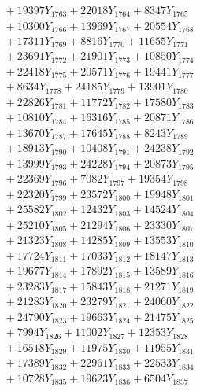 \documentclass[a4paper,10pt]{article}
\begin{document}
{\begin{align}
&\;  + 19397 Y_{1763} + 22018 Y_{1764} + 8347 Y_{1765} \\[0.3ex]
&\;  + 10300 Y_{1766} + 13969 Y_{1767} + 20554 Y_{1768} \\[0.5ex]\allowbreak
&\;  + 17311 Y_{1769} + 8816 Y_{1770} + 11655 Y_{1771} \\[0.3ex]
&\;  + 23691 Y_{1772} + 21901 Y_{1773} + 10850 Y_{1774} \\[0.3ex]
&\;  + 22418 Y_{1775} + 20571 Y_{1776} + 19441 Y_{1777} \\[0.3ex]
&\;  + 8634 Y_{1778} + 24185 Y_{1779} + 13901 Y_{1780} \\[0.3ex]
&\;  + 22826 Y_{1781} + 11772 Y_{1782} + 17580 Y_{1783} \\[0.3ex]
&\;  + 10810 Y_{1784} + 16316 Y_{1785} + 20871 Y_{1786} \\[0.3ex]
&\;  + 13670 Y_{1787} + 17645 Y_{1788} + 8243 Y_{1789} \\[0.3ex]
&\;  + 18913 Y_{1790} + 10408 Y_{1791} + 24238 Y_{1792} \\[0.3ex]
&\;  + 13999 Y_{1793} + 24228 Y_{1794} + 20873 Y_{1795} \\[0.3ex]
&\;  + 22369 Y_{1796} + 7082 Y_{1797} + 19354 Y_{1798} \\[0.5ex]\allowbreak
&\;  + 22320 Y_{1799} + 23572 Y_{1800} + 19948 Y_{1801} \\[0.3ex]
&\;  + 25582 Y_{1802} + 12432 Y_{1803} + 14524 Y_{1804} \\[0.3ex]
&\;  + 25210 Y_{1805} + 21294 Y_{1806} + 23330 Y_{1807} \\[0.3ex]
&\;  + 21323 Y_{1808} + 14285 Y_{1809} + 13553 Y_{1810} \\[0.3ex]
&\;  + 17724 Y_{1811} + 17033 Y_{1812} + 18147 Y_{1813} \\[0.3ex]
&\;  + 19677 Y_{1814} + 17892 Y_{1815} + 13589 Y_{1816} \\[0.3ex]
&\;  + 23283 Y_{1817} + 15843 Y_{1818} + 21271 Y_{1819} \\[0.3ex]
&\;  + 21283 Y_{1820} + 23279 Y_{1821} + 24060 Y_{1822} \\[0.3ex]
&\;  + 24790 Y_{1823} + 19663 Y_{1824} + 21475 Y_{1825} \\[0.3ex]
&\;  + 7994 Y_{1826} + 11002 Y_{1827} + 12353 Y_{1828} \\[0.5ex]\allowbreak
&\;  + 16518 Y_{1829} + 11975 Y_{1830} + 11955 Y_{1831} \\[0.3ex]
&\;  + 17389 Y_{1832} + 22961 Y_{1833} + 22533 Y_{1834} \\[0.3ex]
&\;  + 10728 Y_{1835} + 19623 Y_{1836} + 6504 Y_{1837} \\[0.3ex]

\end{align}}
\end{document}
